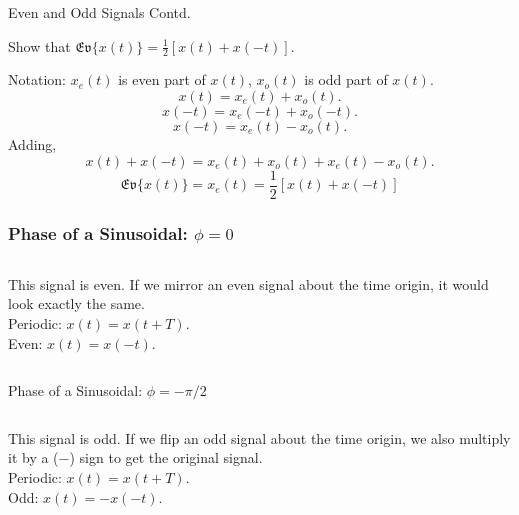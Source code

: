 \begin{frame}[t]{Even and Odd Signals Contd.}
    \begin{example}
        Show that $\mathfrak{Ev}\{x(t)\} = \frac{1}{2}[x(t)+x(-t)]$.
    \end{example}
    Notation: $x_e(t)$ is even part of $x(t)$, $x_o(t)$ is odd part of $x(t)$.
    {
        \begin{equation*}
            x(t) = x_e(t) + x_o(t).
        \end{equation*}
        \pause
        \begin{equation*}
            x(-t) = x_e(-t) + x_o(-t).
        \end{equation*}
        \pause
        \begin{equation*}
            x(-t) = x_e(t) - x_o(t).
        \end{equation*}
        \pause
        Adding,
        \begin{equation*}
            x(t) + x(-t) = x_e(t) + x_o(t) + x_e(t) - x_o(t).
        \end{equation*}
        \pause
        \begin{equation*}
            \mathfrak{Ev}\{x(t)\} =  x_e(t) = \frac{1}{2}[x(t)+x(-t)]
        \end{equation*}
    }
\end{frame}


\begin{frame}[plain]\frametitle{Phase of a Sinusoidal: $\phi = 0$}
    {
        \begin{columns}[t]
            {
                \centering
                
            }
            {
                This signal is \alert{even}. If we mirror an even signal about the time origin, it would look exactly the same.\\[12pt]
                Periodic: $x(t) = x(t+ T)$.\\
                Even: $x(t) = x(-t)$.
            }
        \end{columns}
    }
\end{frame}

\begin{frame}[plain]{Phase of a Sinusoidal: $\phi = -\pi/2$}
    {
        \begin{columns}[t]
            {
                \centering
                
            }
            {
                This signal is \alert{odd}. If we flip an odd signal about the time origin, we also multiply it by a ($-$) sign to get the original signal.\\[12pt]
                Periodic: $x(t) = x(t+ T)$.\\
                Odd: $x(t) = -x(-t)$.
            }
        \end{columns}
    }
\end{frame}

